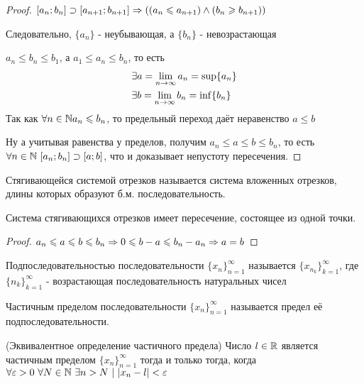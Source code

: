 \begin{proof}
	$[a_n; b_n] \supset [a_{n + 1}; b_{n + 1}] \Rightarrow \left((a_n \leqslant a_{n + 1}) \wedge (b_n \geqslant b_{n + 1})\right)$
	
	Следовательно, $\{a_n\}$ - неубывающая, а $\{b_n\}$ - невозрастающая
	
	$a_n \le b_n \le b_1$, а $a_1 \le a_n \le b_n$, то есть
	\begin{align*}
		&\exists a = \lim\limits_{n \rightarrow \infty} a_n = \sup \{a_n\}
		\\
		&\exists b = \lim\limits_{n \rightarrow \infty} b_n = \inf \{b_n\}
	\end{align*}
	Так как $\forall n \in \mathbb{N} a_n \leqslant b_n$, то предельный переход даёт неравенство $a \le b$
	
	Ну а учитывая равенства у пределов, получим $a_n \le a \le b \le b_n$, то есть $\forall n \in \mathbb{N}\ [a_n; b_n] \supset [a; b]$, что и доказывает непустоту пересечения.
\end{proof}

\begin{definition}
	Стягивающейся системой отрезков называется система вложенных отрезков, длины которых образуют б.м. последовательность.
\end{definition}

\begin{addition}
	Система стягивающихся отрезков имеет пересечение, состоящее из одной точки.
\end{addition}

\begin{proof}
	$a_n \leqslant a \leqslant b \leqslant b_n \Rightarrow 0 \leqslant b - a \leqslant b_n - a_n \Rightarrow a = b$
\end{proof}

\begin{definition}
	Подпоследовательностью последовательности $\{x_n\}_{n = 1}^\infty$ называется $\{x_{n_k}\}_{k = 1}^\infty$, где $\{n_k\}_{k = 1}^\infty$ - возрастающая последовательность натуральных чисел
\end{definition}

\begin{definition}
	Частичным пределом последовательности $\{x_n\}_{n = 1}^\infty$ называется предел её подпоследовательности.
\end{definition}

\begin{theorem} (Эквивалентное определение частичного предела)
	Число $l \in \mathbb{R}$ является частичным пределом $\{x_n\}_{n = 1}^\infty$ тогда и только тогда, когда $\forall \varepsilon > 0\ \forall N \in \mathbb{N}\ \exists n > N\ |\ |x_n - l| < \varepsilon$
\end{theorem}


